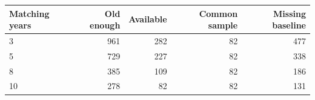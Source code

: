 \begin{tabular}{lrrrr}
\toprule
Matching years & Old enough & Available & Common sample & Missing baseline \\
\midrule
3 & 961 & 282 & 82 & 477 \\
5 & 729 & 227 & 82 & 338 \\
8 & 385 & 109 & 82 & 186 \\
10 & 278 & 82 & 82 & 131 \\
\bottomrule
\end{tabular}
